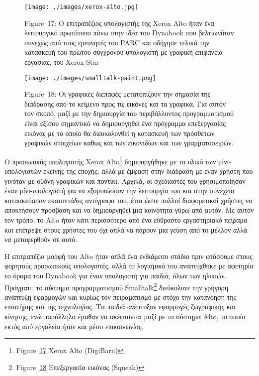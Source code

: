 \documentclass[
]{article}
\begin{document}
\leavevmode{}%
\begin{figure}
\hypertarget{fig:xerox-alto}{%
\centering
\texttt{[image: ./images/xerox-alto.jpg]}
\caption{Figure~17: Ο επιτραπέζιος υπολογιστής της Xerox Alto ήταν ένα
λειτουργικό πρωτότυπο πάνω στην ιδέα του Dynabook που βελτιωνόταν
συνεχώς από τους ερευνητές του PARC και οδήγησε τελικά την κατασκευή του
πρώτου σύγχρονου υπολογιστή με γραφική επιφάνεια εργασίας, του Xerox
Star}\label{fig:xerox-alto}
}
\end{figure}

\leavevmode{}%
\begin{figure}
\hypertarget{fig:smalltalk-paint}{%
\centering
\texttt{[image: ./images/smalltalk-paint.png]}
\caption{Figure~18: Οι γραφικές διεπαφές μετατοπίζουν την σημασία της
διάδρασης από το κείμενο προς τις εικόνες και τα γραφικά. Για αυτόν τον
σκοπό, μαζί με την δημιουργία του περιβάλλοντος προγραμματισμού είναι
εξίσου σημαντικό να δημιουργηθεί ένα πρόγραμμα επεξεργασίας εικόνας με
το οποίο θα διευκολυνθεί η κατασκευή των πρόσθετων γραφικών στοιχείων
καθως και των εικονιδίων και των
γραμματοσειρών.}\label{fig:smalltalk-paint}
}
\end{figure}

Ο προσωπικός υπολογιστής Xerox Alto\footnote{Figure~\protect\hyperlink{fig:xerox-alto}{17}
  Xerox Alto (DigiBarn)} δημιουργήθηκε με το υλικό των μίνι-υπολογιστών
εκείνης της εποχής, αλλά με έμφαση στην διάδραση με έναν χρήστη που
γινόταν με οθόνη γραφικών και ποντίκι. Αρχικά, οι σχεδιαστές του
χρησιμοποίησαν έναν μίνι-υπολογιστή για να εξομοιώσουν την λειτουργία
του και στην συνέχεια κατασκεύασαν εκατοντάδες αντίγραφα του, έτσι ώστε
πολλοί διαφορετικοί χρήστες να αποκτήσουν πρόσβαση και να δημιουργηθεί
μια κοινότητα γύρω από αυτόν. Με αυτόν τον τρόπο, το Alto ήταν κάτι
περισσότερο από ένα εύθραστο εργαστηριακό πείραμα και επέτρεψε στους
χρήστες του όχι απλά να πάρουν μια γεύση από το μέλλον αλλά να
μεταφερθούν σε αυτό.

Η επιτραπέζια μορφή του Alto ήταν απλά ένα ενδιάμεσο στάδιο πριν
φτάσουμε στους φορητούς προσωπικούς υπολογιστές, αλλά το λογισμικό του
αναπτύχθηκε με αφετηρία το όραμα του Dynabook για έναν υπολογιστή για
παιδιά, όλων των ηλικιών. Πράγματι, το σύστημα προγραμματισμού
Smalltalk\footnote{Figure~\protect\hyperlink{fig:smalltalk-paint}{18}
  Eπεξεργασία εικόνας (Squeak)} διεύκολυνε την γρήγορη ανάπτυξη
εφαρμογών και κυρίως τον πειραματισμό με στόχο την κατανόηση της
επιστήμης και της τεχνολογίας. Τα παιδιά ανέπτυξαν εφαρμογές ζωγραφικής
και κίνησης, ενώ παράλληλα έμαθαν να σκέφτονται μαζί με το σύστημα Alto,
το οποίο εκτός από εργαλείο ήταν και μέσο επικοινωνίας.
\end{document}

